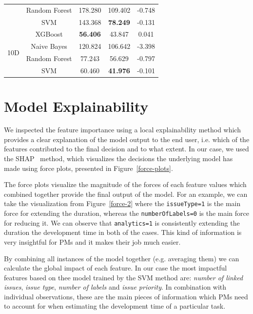 \documentclass[conference,compsoc]{IEEEtran}
\begin{document}
\begin{table}[!t]
\begin{tabular}{c|c|c|c|c}
		&Random Forest& 178.280 & 109.402 & -0.748 \\
		& SVM & 143.368 & \textbf{78.249} & -0.131 \\
		\hline
		\multirow{4}{*}{10D}
		&XGBoost& \textbf{56.406} & 43.847 & 0.041 \\
		&Naive Bayes& 120.824 & 106.642 & -3.398 \\
		&Random Forest& 77.243 & 56.629 & -0.797 \\
		& SVM & 60.460 & \textbf{41.976} & -0.101 \\
	\end{tabular}
\end{table}

\section{Model Explainability}
We inspected the feature importance using a local explainability method which provides a clear explanation of the model output to the end user, i.e. which of the features contributed to the final decision and to what extent. In our case, we used the SHAP~\cite{lundberg2020local2global} method, which visualizes the decisions the underlying model has made using force plots, presented in Figure~\ref{force-plots}.

The force plots visualize the magnitude of the forces of each feature values which combined together provide the final output of the model. For an example, we can take the visualization from Figure~\ref{force-2} where the \texttt{issueType=1} is the main force for extending the duration, whereas the \texttt{numberOfLabels=0} is the main force for reducing it. We can observe that \texttt{analytics=1} is consistently extending the duration the development time in both of the cases. This kind of information is very insightful for PMs and it makes their job much easier.

By combining all instances of the model together (e.g. averaging them) we can calculate the global impact of each feature. In our case the most impactful features based on thee model trained by the SVM method are: \textit{number of linked issues}, \textit{issue type}, \textit{number of labels} and \textit{issue priority}. In combination with individual observations, these are the main pieces of information which PMs need to account for when estimating the development time of a particular task.
\end{document}
